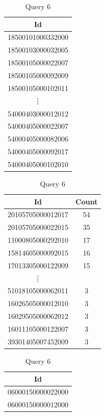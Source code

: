 \documentclass{article}
\begin{document}
\begin{table}[H]
  \begin{minipage}{.3\linewidth}
    \centering
    \begin{tabular}{c}
      Id \\
      \midrule
      18500101000332000 \\
      18500103000032005 \\
      18500105000022007 \\
      18500105000092009 \\
      18500105000102011 \\
      \vdots \\
      54000403000012012 \\
      54000405000022007 \\
      54000405000082006 \\
      54000405000092017 \\
      54000405000102010 \\
      \bottomrule
    \end{tabular}
    \caption*{Query 3}
  \end{minipage}
  \begin{minipage}{.3\linewidth}
    \centering
    \begin{tabular}{cc}
      Id & Count \\
      \midrule
      20105705000012017 & 54 \\
      20105705000022015 & 35 \\
      11000805000292010 & 17 \\
      15814605000092015 & 16 \\
      17013305000122009 & 15 \\
      \vdots \\
      51018105000062011	& 3 \\
      16026505000012010	& 3 \\
      16029505000062012	& 3 \\
      16011105000122007	& 3 \\
      39301405007452009	& 3 \\
      \bottomrule
    \end{tabular}
    \caption*{Query 6}
  \end{minipage}
  \begin{minipage}{.3\linewidth}
    \centering
    \begin{tabular}{c}
      Id \\
      \midrule
      06000150000022000 \\
      06000150000012000 \\

\end{tabular}
\end{minipage}
\end{table}
\end{document}

